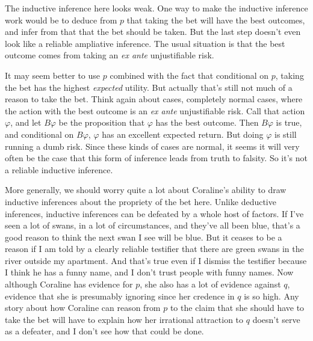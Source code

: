 {The inductive inference here looks weak. One way to make the inductive inference work would be to deduce from \(p\) that taking the bet will have the best outcomes, and infer from that that the bet should be taken. But the last step doesn't even look like a reliable ampliative inference. The usual situation is that the best outcome comes from taking an \textit{ex ante} unjustifiable risk.

It may seem better to use \(p\) combined with the fact that conditional on \(p\), taking the bet has the highest \textit{expected} utility. But actually that's still not much of a reason to take the bet. Think again about cases, completely normal cases, where the action with the best outcome is an \textit{ex ante} unjustifiable risk. Call that action \(\varphi\), and let \(B \varphi\) be the proposition that \(\varphi\) has the best outcome. Then \(B \varphi\) is true, and conditional on \(B \varphi\), \(\varphi\) has an excellent expected return. But doing \(\varphi\) is still running a dumb risk. Since these kinds of cases are normal, it seems it will very often be the case that this form of inference leads from truth to falsity. So it's not a reliable inductive inference.

More generally, we should worry quite a lot about Coraline's ability to draw inductive inferences about the propriety of the bet here. Unlike deductive inferences, inductive inferences can be defeated by a whole host of factors. If I've seen a lot of swans, in a lot of circumstances, and they've all been blue, that's a good reason to think the next swan I see will be blue. But it ceases to be a reason if I am told by a clearly reliable testifier that there are green swans in the river outside my apartment. And that's true even if I dismiss the testifier because I think he has a funny name, and I don't trust people with funny names. Now although Coraline has evidence for \(p\), she also has a lot of evidence against \(q\), evidence that she is presumably ignoring since her credence in \(q\) is so high. Any story about how Coraline can reason from \(p\) to the claim that she should have to take the bet will have to explain how her irrational attraction to \(q\) doesn't serve as a defeater, and I don't see how that could be done.}

